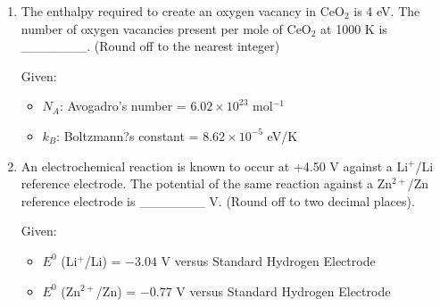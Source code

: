 \documentclass[journal,12pt,onecolumn]{IEEEtran}
\theoremstyle{remark}
\begin{document}
\begin{enumerate}
\item The enthalpy required to create an oxygen vacancy in CeO$_2$ is 4 eV. The number of oxygen vacancies present per mole of CeO$_2$ at 1000 K is \_\_\_\_\_\_\_.
(Round off to the nearest integer)

Given:
\begin{itemize}
	\item $N_A$: Avogadro's number = $6.02 \times 10^{23}$ mol$^{-1}$
	\item $k_B$: Boltzmann?s constant = $8.62 \times 10^{-5}$ eV/K
\end{itemize}

\item An electrochemical reaction is known to occur at +4.50 V against a Li$^+$/Li reference electrode. The potential of the same reaction against a Zn$^{2+}$/Zn reference electrode is \_\_\_\_\_\_\_ V. (Round off to two decimal places).

Given:
\begin{itemize}
	\item $E^0$ (Li$^+$/Li) = $-3.04$ V versus Standard Hydrogen Electrode
	\item $E^0$ (Zn$^{2+}$/Zn) = $-0.77$ V versus Standard Hydrogen Electrode
\end{itemize}

\end{enumerate}
\end{document}
